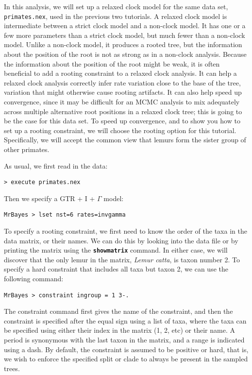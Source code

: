 \documentclass[12pt]{book}
\newcommand{\ttt}[1]{\texttt{#1}}
\newcommand{\tb}[1]{\ttt{\textbf{#1}}}
\begin{document}
In this analysis, we will set up a relaxed clock model for the same data set,
\ttt{primates.nex}, used in the previous two tutorials. A relaxed clock model is intermediate
between a strict clock model and a non-clock model. It has one or a few more parameters than a
strict clock model, but much fewer than a non-clock model. Unlike a non-clock model, it produces a
rooted tree, but the information about the position of the root is not as strong as in a non-clock
analysis. Because the information about the position of the root might be weak, it is often
beneficial to add a rooting constraint to a relaxed clock analysis. It can help a relaxed clock
analysis correctly infer rate variation close to the base of the tree, variation that might
otherwise cause rooting artifacts. It can also help speed up convergence, since it may be difficult
for an MCMC analysis to mix adequately across multiple alternative root positions in a relaxed
clock tree; this is going to be the case for this data set. To speed up convergence, and to show
you how to set up a rooting constraint, we will choose the rooting option for this tutorial.
Specifically, we will accept the common view that lemurs form the sister group of other primates.

As usual, we first read in the data:

\begin{verbatim}
> execute primates.nex
\end{verbatim}

Then we specify a GTR + I + $\Gamma$ model:

\begin{verbatim}
MrBayes > lset nst=6 rates=invgamma
\end{verbatim}

To specify a rooting constraint, we first need to know the order of the taxa in the data matrix, or
their names. We can do this by looking into the data file or by printing the matrix using the
\tb{showmatrix} command. In either case, we will discover that the only lemur in the matrix,
\textit{Lemur catta}, is taxon number 2. To specify a hard constraint that includes all taxa but
taxon 2, we can use the following command:

\begin{verbatim}
MrBayes > constraint ingroup = 1 3-.
\end{verbatim}

The constraint command first gives the name of the constraint, and then the constraint is specified
after the equal sign using a list of taxa, where the taxa can be specified using either their index
in the matrix (1, 2, etc) or their name. A period is synonymous with the last taxon in the matrix,
and a range is indicated using a dash. By default, the constraint is assumed to be positive or
hard, that is, we wish to enforce the specified split or clade to always be present in the sampled
trees.
\end{document}
